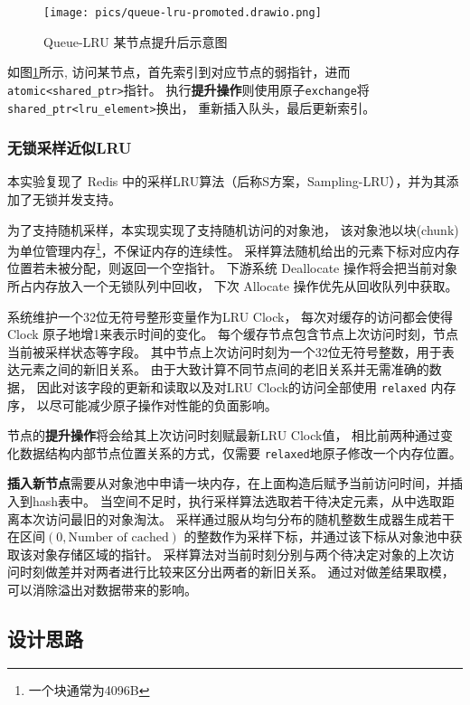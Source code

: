 \begin{figure}
    \centering
    \texttt{[image: pics/queue-lru-promoted.drawio.png]}
    \caption{Queue-LRU 某节点提升后示意图}
    \label{fig:queue-lru-promoted}
\end{figure}

如图\ref{fig:queue-lru-promoted}所示,
访问某节点，首先索引到对应节点的弱指针，进而\verb|atomic<shared_ptr>|指针。
执行\textbf{提升操作}则使用原子\verb|exchange|将\verb|shared_ptr<lru_element>|换出，
重新插入队头，最后更新索引。

\subsubsection{无锁采样近似LRU}

本实验复现了 Redis 中的采样LRU算法（后称S方案，Sampling-LRU），并为其添加了无锁并发支持。

为了支持随机采样，本实现实现了支持随机访问的对象池，
该对象池以块(chunk)为单位管理内存\footnote{一个块通常为4096B}，不保证内存的连续性。
采样算法随机给出的元素下标对应内存位置若未被分配，则返回一个空指针。
下游系统 Deallocate 操作将会把当前对象所占内存放入一个无锁队列中回收，
下次 Allocate 操作优先从回收队列中获取。

系统维护一个32位无符号整形变量作为LRU Clock，
每次对缓存的访问都会使得Clock 原子地增1来表示时间的变化。
每个缓存节点包含节点上次访问时刻，节点当前被采样状态等字段。
其中节点上次访问时刻为一个32位无符号整数，用于表达元素之间的新旧关系。
由于大致计算不同节点间的老旧关系并无需准确的数据，
因此对该字段的更新和读取以及对LRU Clock的访问全部使用 \verb|relaxed| 内存序，
以尽可能减少原子操作对性能的负面影响。

节点的\textbf{提升操作}将会给其上次访问时刻赋最新LRU Clock值，
相比前两种通过变化数据结构内部节点位置关系的方式，仅需要 \verb|relaxed|地原子修改一个内存位置。

\textbf{插入新节点}需要从对象池中申请一块内存，在上面构造后赋予当前访问时间，并插入到hash表中。
当空间不足时，执行采样算法选取若干待决定元素，从中选取距离本次访问最旧的对象淘汰。
采样通过服从均匀分布的随机整数生成器生成若干在区间$\allowbreak (0, \mbox{Number of cached})$
的整数作为采样下标，并通过该下标从对象池中获取该对象存储区域的指针。
采样算法对当前时刻分别与两个待决定对象的上次访问时刻做差并对两者进行比较来区分出两者的新旧关系。
通过对做差结果取模，可以消除溢出对数据带来的影响。

\subsection{设计思路}

